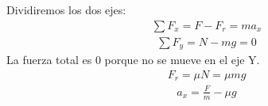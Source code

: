 \documentclass{article}
\begin{document}
Dividiremos los dos ejes:
\begin{equation}
    \begin{split}
        \sum F_{x}=F-F_{r}=ma_{x}
    \end{split}
\end{equation}
\begin{equation}
    \begin{split}
        \sum F_{y}=N-mg=0
    \end{split}
\end{equation}
La fuerza total es $0$ porque no se mueve en el eje Y.
\begin{equation}
    \begin{split}
        F_{r}=\mu N=\mu mg
    \end{split}
\end{equation}
\begin{equation}
    \begin{split}
        a_{x}=\frac{F}{m}-\mu g
    \end{split}
\end{equation}
\end{document}

